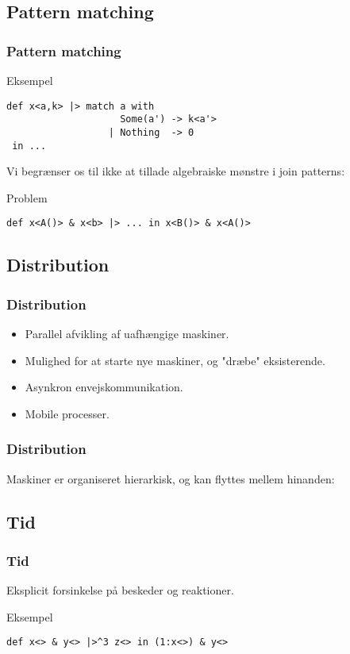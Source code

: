 \documentclass{beamer}
\begin{document}
\subsection{Pattern matching}
\begin{frame}[fragile]
\frametitle{Pattern matching}
\begin{block}{Eksempel}
\begin{lstlisting}
def x<a,k> |> match a with
                    Some(a') -> k<a'>
                  | Nothing  -> 0
 in ...
\end{lstlisting}
\end{block}
Vi begrænser os til ikke at tillade algebraiske mønstre i join patterns:
\begin{block}{Problem}
\begin{lstlisting}
def x<A()> & x<b> |> ... in x<B()> & x<A()>
\end{lstlisting}
\end{block}
\end{frame}


\subsection{Distribution}

\begin{frame}[fragile]
\frametitle{Distribution}
\begin{itemize}
\item
  Parallel afvikling af uafhængige maskiner.

\item
  Mulighed for at starte nye maskiner, og "dræbe" eksisterende.

\item
  Asynkron envejskommunikation.

\item
  Mobile processer.
\end{itemize}
\end{frame}

\begin{frame}[fragile]
\frametitle{Distribution}
Maskiner er organiseret hierarkisk, og kan flyttes mellem hinanden:
\begin{center}
\end{center}
\end{frame}

\subsection{Tid}
\begin{frame}[fragile]
\frametitle{Tid}
Eksplicit forsinkelse på beskeder og reaktioner.
\begin{block}{Eksempel}
\begin{lstlisting}
def x<> & y<> |>^3 z<> in (1:x<>) & y<>
\end{lstlisting}
\end{block}
\end{frame}
\end{document}
